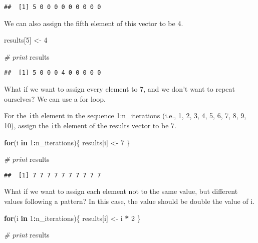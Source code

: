 \documentclass[
]{article}
\newenvironment{Shaded}{\begin{snugshade}}{\end{snugshade}}
\newcommand{\CommentTok}[1]{\textcolor[rgb]{0.56,0.35,0.01}{\textit{#1}}}
\newcommand{\ControlFlowTok}[1]{\textcolor[rgb]{0.13,0.29,0.53}{\textbf{#1}}}
\newcommand{\DecValTok}[1]{\textcolor[rgb]{0.00,0.00,0.81}{#1}}
\newcommand{\NormalTok}[1]{#1}
\newcommand{\OtherTok}[1]{\textcolor[rgb]{0.56,0.35,0.01}{#1}}
\newcommand{\SpecialCharTok}[1]{\textcolor[rgb]{0.81,0.36,0.00}{\textbf{#1}}}
\begin{document}
\begin{verbatim}
##  [1] 5 0 0 0 0 0 0 0 0 0
\end{verbatim}

We can also assign the fifth element of this vector to be 4.

\begin{Shaded}
\begin{Highlighting}[]
\NormalTok{results[}\DecValTok{5}\NormalTok{] }\OtherTok{\textless{}{-}} \DecValTok{4}

\CommentTok{\# print}
\NormalTok{results}
\end{Highlighting}
\end{Shaded}

\begin{verbatim}
##  [1] 5 0 0 0 4 0 0 0 0 0
\end{verbatim}

What if we want to assign every element to 7, and we don't want to
repeat ourselves? We can use a for loop.

For the \texttt{i}th element in the sequence 1:n\_iterations (i.e., 1,
2, 3, 4, 5, 6, 7, 8, 9, 10), assign the \texttt{i}th element of the
results vector to be 7.

\begin{Shaded}
\begin{Highlighting}[]
\ControlFlowTok{for}\NormalTok{(i }\ControlFlowTok{in} \DecValTok{1}\SpecialCharTok{:}\NormalTok{n\_iterations)\{}
\NormalTok{  results[i] }\OtherTok{\textless{}{-}} \DecValTok{7}
\NormalTok{\}}

\CommentTok{\# print}
\NormalTok{results}
\end{Highlighting}
\end{Shaded}

\begin{verbatim}
##  [1] 7 7 7 7 7 7 7 7 7 7
\end{verbatim}

What if we want to assign each element not to the same value, but
different values following a pattern? In this case, the value should be
double the value of i.

\begin{Shaded}
\begin{Highlighting}[]
\ControlFlowTok{for}\NormalTok{(i }\ControlFlowTok{in} \DecValTok{1}\SpecialCharTok{:}\NormalTok{n\_iterations)\{}
\NormalTok{  results[i] }\OtherTok{\textless{}{-}}\NormalTok{ i }\SpecialCharTok{*} \DecValTok{2}
\NormalTok{\}}

\CommentTok{\# print}
\NormalTok{results}
\end{Highlighting}
\end{Shaded}
\end{document}

